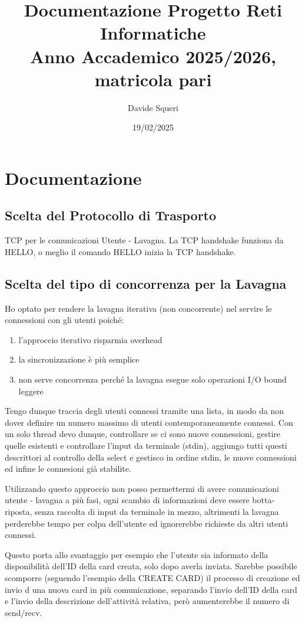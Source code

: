 \documentclass[12pt,a4paper, titlepage]{article}
\author{Davide Squeri}
\title{Documentazione Progetto Reti Informatiche\\[0.3em]
\large{Anno Accademico 2025/2026, matricola pari}}
\date{19/02/2025}
\begin{document}
\maketitle

\section*{Documentazione}
\subsection*{Scelta del Protocollo di Trasporto}
TCP per le comunicazioni Utente - Lavagna. La TCP handshake funziona da HELLO, o meglio il comando HELLO inizia la TCP handshake.
\subsection*{Scelta del tipo di concorrenza per la Lavagna}
Ho optato per rendere la lavagna iterativa (non concorrente) nel servire le connessioni con gli utenti poiché:
\begin{enumerate}
    \item l'approccio iterativo risparmia overhead
    \item la sincronizzazione è più semplice
    \item non serve concorrenza perché la lavagna esegue solo operazioni I/O bound leggere
\end{enumerate}
Tengo dunque traccia degli utenti connessi tramite una lista, in modo da non dover definire un numero massimo di utenti contemporaneamente connessi.
Con un solo thread devo dunque, controllare se ci sono nuove connessioni, gestire quelle esistenti e controllare l'input da terminale (stdin), aggiungo tutti questi descrittori al controllo della select e gestisco in ordine stdin, le nuove connessioni ed infine le connesioni già stabilite.

Utilizzando questo approccio non posso permettermi di avere comunicazioni utente - lavagna a più fasi, ogni scambio di informazioni deve essere botta-riposta, senza raccolta di input da terminale in mezzo, altrimenti la lavagna perderebbe tempo per colpa dell'utente ed ignorerebbe richieste da altri utenti connessi.

Questo porta allo svantaggio per esempio che l'utente sia informato della disponibilità dell'ID della card creata, solo dopo averla inviata. Sarebbe possibile scomporre (seguendo l'esempio della CREATE CARD) il processo di creazione ed invio d una nuova card in più comunicazione, separando l'invio dell'ID della card e l'invio della descrizione dell'attività relativa, però aumenterebbe il numero di send/recv.
\end{document}
